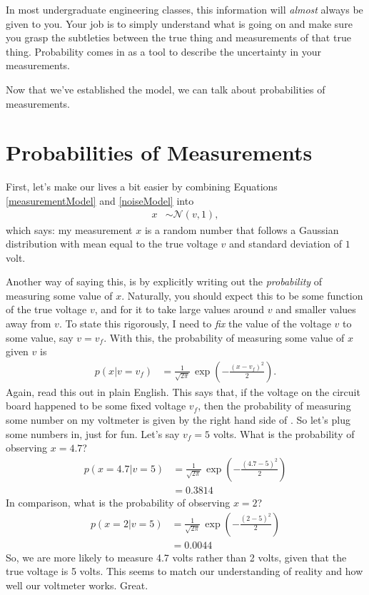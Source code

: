\documentclass[10pt,letterpaper]{article}
\begin{document}
In most undergraduate engineering classes, this information will \emph{almost} always be given to you. Your job is to simply understand what is going on and make sure you grasp the subtleties between the true thing and measurements of that true thing. Probability comes in as a tool to describe the uncertainty in your measurements.

Now that we've established the model, we can talk about probabilities of measurements.

\section{Probabilities of Measurements}
First, let's make our lives a bit easier by combining Equations \eqref{measurementModel} and \eqref{noiseModel} into
\begin{align}
	x &\sim \mathcal{N}(v,1),
\end{align}
which says: my measurement $x$ is a random number that follows a Gaussian distribution with mean equal to the true voltage $v$ and standard deviation of $1$ volt.

Another way of saying this, is by explicitly writing out the \emph{probability} of measuring some value of $x$. Naturally, you should expect this to be some function of the true voltage $v$, and for it to take large values around $v$ and smaller values away from $v$. To state this rigorously, I need to \emph{fix} the value of the voltage $v$ to some value, say $v = v_f$. With this, the probability of measuring some value of $x$ given $v$ is
\begin{align}
	p(x \vert v=v_f) &= \frac{1}{\sqrt{2\pi}}\,\exp\left( -\frac{(x-v_f)^2}{2} \right) \label{prob}.
\end{align}
Again, read this out in plain English. This says that, if the voltage on the circuit board happened to be some fixed voltage $v_f$, then the probability of measuring some number on my voltmeter is given by the right hand side of . So let's plug some numbers in, just for fun. Let's say $v_f = 5$ volts. What is the probability of observing $x=4.7$?
\begin{align}
	p(x=4.7 \vert v = 5) &= \frac{1}{\sqrt{2\pi}}\,\exp\left(-\frac{(4.7-5)^2}{2} \right)\\
						 &= 0.3814
\end{align}
In comparison, what is the probability of observing $x=2$?
\begin{align}
	p(x=2 \vert v = 5) &= \frac{1}{\sqrt{2\pi}}\,\exp\left(-\frac{(2-5)^2}{2} \right)\\
						 &= 0.0044
\end{align}
So, we are more likely to measure 4.7 volts rather than 2 volts, given that the true voltage is 5 volts. This seems to match our understanding of reality and how well our voltmeter works. Great.
\end{document}
